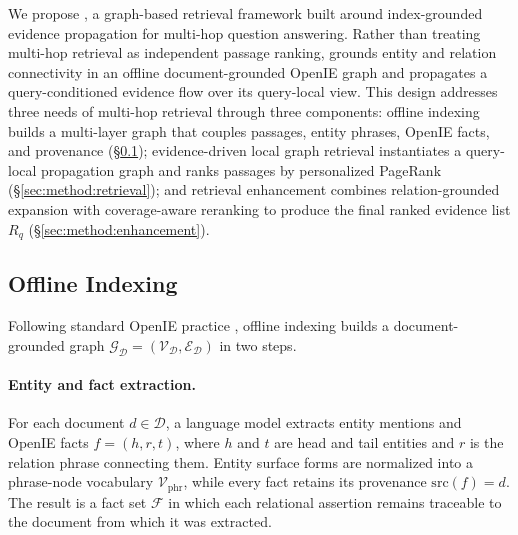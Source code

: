 We propose \methodname{}, a graph-based retrieval framework built around
index-grounded evidence propagation for multi-hop question answering.
Rather than treating multi-hop retrieval as independent passage ranking,
\methodname{} grounds entity and relation connectivity in an offline
document-grounded OpenIE graph and propagates a query-conditioned
evidence flow over its query-local view. This design addresses three
needs of multi-hop retrieval through three components: offline indexing
builds a multi-layer graph that couples passages, entity phrases, OpenIE
facts, and provenance (\S\ref{sec:method:substrate}); evidence-driven
local graph retrieval instantiates a query-local propagation graph and
ranks passages by personalized PageRank (\S\ref{sec:method:retrieval});
and retrieval enhancement combines relation-grounded expansion with
coverage-aware reranking to produce the final ranked evidence list
$R_q$ (\S\ref{sec:method:enhancement}).

\subsection{Offline Indexing}
\label{sec:method:substrate}

Following standard OpenIE practice
\citep{angeli2015leveraging,gutierrez2025hipporag}, offline indexing
builds a document-grounded graph
$\mathcal{G}_{\mathcal{D}}=(\mathcal{V}_{\mathcal{D}},\mathcal{E}_{\mathcal{D}})$
in two steps.

\paragraph{Entity and fact extraction.}
For each document $d \in \mathcal{D}$, a language model extracts entity
mentions and OpenIE facts $f=(h,r,t)$, where $h$ and $t$ are head and tail
entities and $r$ is the relation phrase connecting them. Entity surface
forms are normalized into a phrase-node vocabulary
$\mathcal{V}_{\mathrm{phr}}$, while every fact retains its provenance
$\mathrm{src}(f)=d$. The result is a fact set $\mathcal{F}$ in which each
relational assertion remains traceable to the document from which it was
extracted.

